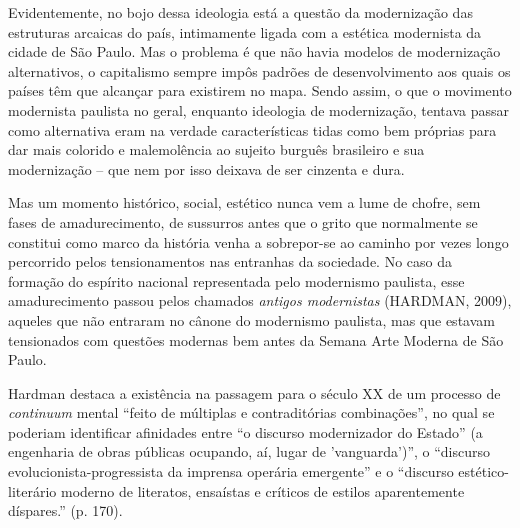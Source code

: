 Evidentemente, no bojo dessa ideologia está a questão da modernização
das estruturas arcaicas do país, intimamente ligada com a estética
modernista da cidade de São Paulo. Mas o problema é que não havia
modelos de modernização alternativos, o capitalismo sempre impôs padrões
de desenvolvimento aos quais os países têm que alcançar para existirem
no mapa. Sendo assim, o que o movimento modernista paulista no geral,
enquanto ideologia de modernização, tentava passar como alternativa eram
na verdade características tidas como bem próprias para dar mais
colorido e malemolência ao sujeito burguês brasileiro e sua modernização
-- que nem por isso deixava de ser cinzenta e dura.

Mas um momento histórico, social, estético nunca vem a lume de chofre,
sem fases de amadurecimento, de sussurros antes que o grito que
normalmente se constitui como marco da história venha a sobrepor-se ao
caminho por vezes longo percorrido pelos tensionamentos nas entranhas da
sociedade. No caso da formação do espírito nacional representada pelo
modernismo paulista, esse amadurecimento passou pelos chamados
\emph{antigos modernistas} (HARDMAN, 2009), aqueles que não entraram no
cânone do modernismo paulista, mas que estavam tensionados com questões
modernas bem antes da Semana Arte Moderna de São Paulo.

Hardman destaca a existência na passagem para o século XX de um processo
de \emph{continuum} mental ``feito de múltiplas e contraditórias
combinações'', no qual se poderiam identificar afinidades entre ``o
discurso modernizador do Estado'' (a engenharia de obras públicas
ocupando, aí, lugar de 'vanguarda')'', o ``discurso
evolucionista-progressista da imprensa operária emergente'' e o
``discurso estético-literário moderno de literatos, ensaístas e críticos
de estilos aparentemente díspares.'' (p. 170).

